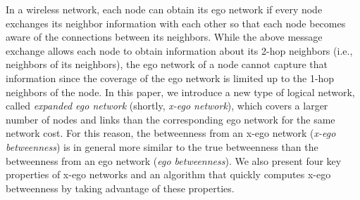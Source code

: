 In a wireless network, each node can obtain its ego network if every node exchanges its neighbor information with each other so that each node becomes aware of the connections between its neighbors.
While the above message exchange allows each node to obtain information about its 2-hop neighbors (i.e., neighbors of its neighbors), the ego network of a node cannot capture that information since the coverage of the ego network is limited up to the 1-hop neighbors of the node. 
In this paper, we introduce a new type of logical network, called \emph{expanded ego network} (shortly, \emph{x-ego network}), which covers a larger number of nodes and links than the corresponding ego network for the same network cost.
For this reason, the betweenness from an x-ego network (\emph{x-ego betweenness}) is in general more similar to the true betweenness than the betweenness from an ego network (\emph{ego betweenness}).
We also present four key properties of x-ego networks and an algorithm that quickly computes x-ego betweenness by taking advantage of these properties.
